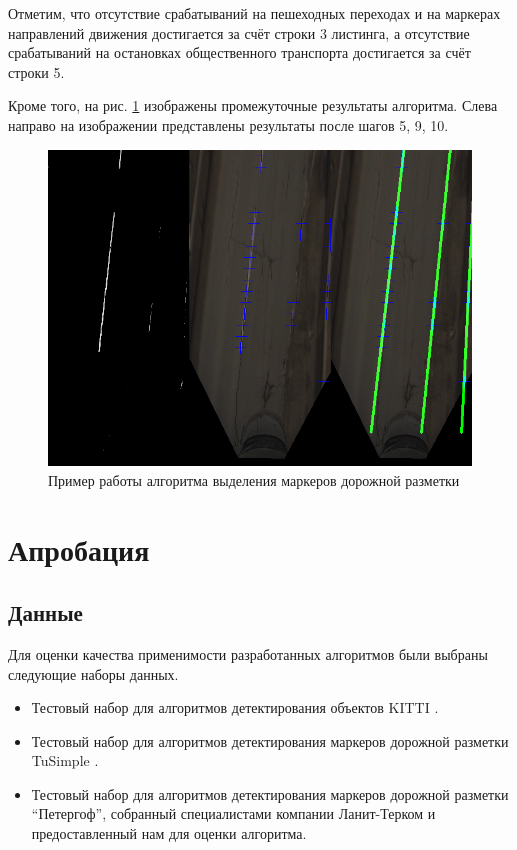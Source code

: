 \documentclass[aps,%
14pt,%
final,%
oneside,
onecolumn,%
musixtex, %
superscriptaddress,%
centertags]{extarticle} %
\begin{document}
Отметим, что отсутствие срабатываний на пешеходных переходах и на маркерах направлений движения достигается за счёт строки 3 листинга, а отсутствие срабатываний на остановках общественного транспорта достигается за счёт строки 5.

Кроме того, на рис. \ref{fig:lanes_pipline} изображены промежуточные результаты алгоритма. Слева направо на изображении представлены результаты после шагов 5, 9, 10. 

\begin{figure}[H]
     \includegraphics[width=\textwidth]{lanes_pipeline.png}
     \caption{Пример работы алгоритма выделения маркеров дорожной разметки}
     \label{fig:lanes_pipline}
\end{figure}


\newpage
\section{Апробация}

\subsection{Данные}

Для оценки качества применимости разработанных алгоритмов были выбраны следующие наборы данных.
\begin{itemize}
\item Тестовый набор для алгоритмов детектирования объектов KITTI \cite{Geiger2012CVPR}.
\item Тестовый набор для алгоритмов детектирования маркеров дорожной разметки TuSimple \cite{tusimple}.
\item Тестовый набор для алгоритмов детектирования маркеров дорожной разметки ``Петергоф'', собранный специалистами компании Ланит-Терком и предоставленный нам для оценки алгоритма.
\end{itemize}
\end{document}
